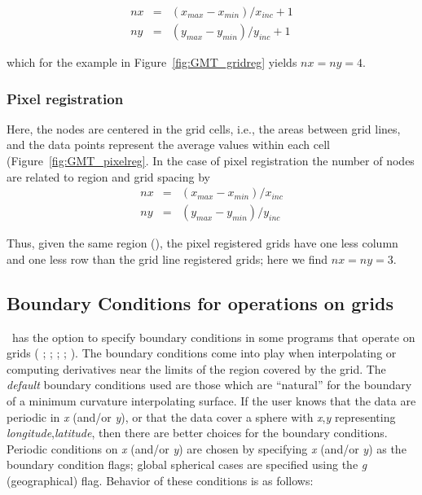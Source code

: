 \[ \begin{array}{ccl} 
nx & =  &       (x_{max} - x_{min}) / x_{inc} + 1       \\ 
ny & =  &       (y_{max} - y_{min}) / y_{inc} + 1
\end{array} \]

which for the example in Figure~\ref{fig:GMT_gridreg} yields $nx = ny = 4$.



\subsubsection{Pixel registration}

Here, the nodes are centered in the grid cells, i.e., the areas
between grid lines, and the data points represent the average
values within each cell (Figure~\ref{fig:GMT_pixelreg}.
In the case of pixel registration the number of nodes are related
to region and grid spacing by \\

\[ \begin{array}{ccl} 
nx & =  &       (x_{max} - x_{min}) / x_{inc}   \\ 
ny & =  &       (y_{max} - y_{min}) / y_{inc}
\end{array} \]

Thus, given the same region (), the pixel registered grids have one less
column and one less row than the grid line registered grids; here we
find $nx = ny = 3$.



\subsection{Boundary Conditions for operations on grids} 

\GMT\ has the option to specify boundary conditions in some programs
that operate on grids ( ; 
;  ;  ;
 ).  The boundary conditions come into play
when interpolating or computing derivatives near the limits of the
region covered by the grid. The \emph{default} boundary
conditions used are those which are ``natural'' for the boundary
of a minimum curvature interpolating surface.
If the user knows that the data are periodic in {\it x} (and/or
{\it y}), or that the data cover a sphere with {\it x},{\it y}
representing {\it longitude},{\it latitude}, then there are better
choices for the boundary conditions.
Periodic conditions on {\it x} (and/or {\it y}) are chosen by
specifying {\it x} (and/or {\it y}) as the boundary condition flags;
global spherical cases are specified using the {\it g} (geographical)
flag.  Behavior of these conditions is as follows:

